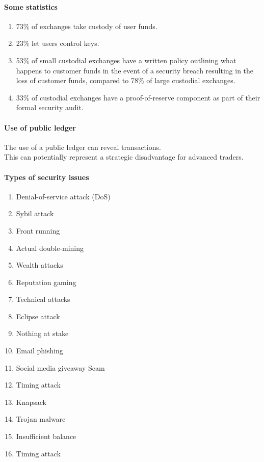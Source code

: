 \documentclass[]{article}
\begin{document}
	\paragraph{Some statistics}
	\begin{enumerate}
	\item 73\% of exchanges take custody of user funds.
	\item  23\% let users control keys.
	\item 53\% of small custodial exchanges have a written 
	policy outlining what happens to customer funds in the 
	event of a security breach resulting in the loss of customer 
	funds, compared to 78\% of large custodial exchanges.
	\item 33\% of custodial exchanges have a proof-of-reserve 
	component as part of their formal security audit.
	\end{enumerate}
	\paragraph{Use of public ledger}
	The use of a public ledger can reveal transactions.\\
	This can potentially represent a strategic disadvantage
	for advanced traders.\\	
	\paragraph{Types of security issues}
	\begin{enumerate}
	 \item Denial-of-service attack (DoS)
	 \item Sybil attack
	 \item Front running
	 \item Actual double-mining 
	\item Wealth attacks
    \item Reputation gaming
	\item Technical attacks
	 \item Eclipse attack 
	\item Nothing at stake 
    \item Email phishing
	\item Social media giveaway Scam
	\item Timing attack
	\item Knapsack
	\item Trojan malware
	\item Insufficient balance
	\item Timing attack
	\end{enumerate}
\end{document}
